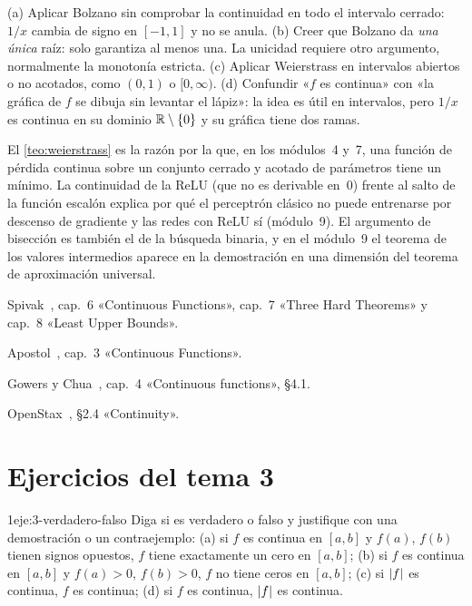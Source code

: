 \begin{observacion}\label{obs:3-errores}
(a) Aplicar Bolzano sin comprobar la continuidad en todo el intervalo cerrado: $1/x$ cambia de signo en $[-1,1]$ y no se anula.
(b) Creer que Bolzano da \emph{una única} raíz: solo garantiza al menos una. La unicidad requiere otro argumento, normalmente la monotonía estricta.
(c) Aplicar Weierstrass en intervalos abiertos o no acotados, como $(0,1)$ o $[0,\infty)$.
(d) Confundir «$f$ es continua» con «la gráfica de $f$ se dibuja sin levantar el lápiz»: la idea es útil en intervalos, pero $1/x$ es continua en su dominio $\mathbb{R}\setminus\{0\}$ y su gráfica tiene dos ramas.
\end{observacion}

\begin{observacion}
El \cref{teo:weierstrass} es la razón por la que, en los módulos~4 y~7, una función de pérdida continua sobre un conjunto cerrado y acotado de parámetros tiene un mínimo. La continuidad de la ReLU (que no es derivable en~0) frente al salto de la función escalón explica por qué el perceptrón clásico no puede entrenarse por descenso de gradiente y las redes con ReLU sí (módulo~9). El argumento de bisección es también el de la búsqueda binaria, y en el módulo~9 el teorema de los valores intermedios aparece en la demostración en una dimensión del teorema de aproximación universal.
\end{observacion}

\begin{lecturas}
\item Spivak~\cite{spivak}, cap.~6 «Continuous Functions», cap.~7 «Three Hard Theorems» y cap.~8 «Least Upper Bounds».
\item Apostol~\cite{apostol}, cap.~3 «Continuous Functions».
\item Gowers y Chua~\cite{cambA1}, cap.~4 «Continuous functions», §4.1.
\item OpenStax~\cite{osc1}, §2.4 «Continuity».
\end{lecturas}

\section*{Ejercicios del tema 3}

\begin{ejercicio}{1}{eje:3-verdadero-falso}
Diga si es verdadero o falso y justifique con una demostración o un contraejemplo: (a) si $f$ es continua en $[a,b]$ y $f(a)$, $f(b)$ tienen signos opuestos, $f$ tiene exactamente un cero en $[a,b]$; (b) si $f$ es continua en $[a,b]$ y $f(a)>0$, $f(b)>0$, $f$ no tiene ceros en $[a,b]$; (c) si $\lvert f\rvert$ es continua, $f$ es continua; (d) si $f$ es continua, $\lvert f\rvert$ es continua.
\end{ejercicio}

